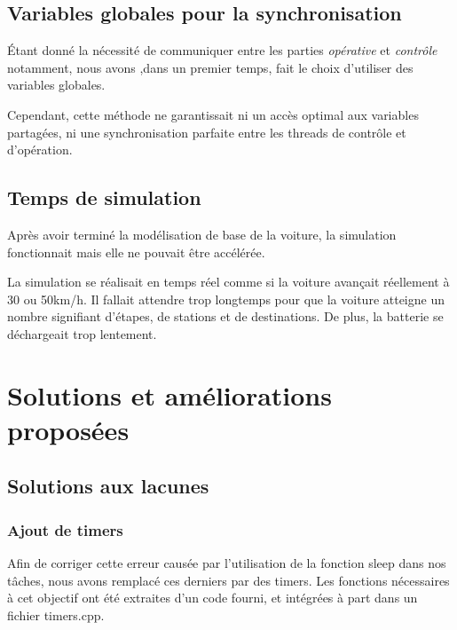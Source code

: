 \documentclass[conference]{IEEEtran}
\begin{document}
\subsection{Variables globales pour la synchronisation}

Étant donné la nécessité de communiquer entre les parties \emph{opérative} et
\emph{contrôle} notamment, nous avons ,dans un premier temps, fait le choix d'utiliser des
variables globales. 

Cependant, cette méthode ne garantissait ni un accès optimal aux variables partagées, ni
une synchronisation parfaite entre les threads de contrôle et d'opération.

\subsection{Temps de simulation}

Après avoir terminé la modélisation de base de la voiture, la simulation fonctionnait mais
elle ne pouvait être accélérée.

La simulation se réalisait en temps réel comme si la voiture avançait réellement à 30 ou
50km/h. Il fallait attendre trop longtemps pour que la voiture atteigne un nombre
signifiant d'étapes, de stations et de destinations. De plus, la batterie se déchargeait
trop lentement.


\section{Solutions et améliorations proposées}
\label{sec:ameliorations}

\subsection{Solutions aux lacunes}

\subsubsection{Ajout de timers}

Afin de corriger cette erreur causée par l'utilisation de la fonction sleep dans nos
tâches, nous avons remplacé ces derniers par des timers. Les fonctions nécessaires à cet
objectif ont été extraites d'un code fourni, et intégrées à part dans un fichier
timers.cpp. 
\end{document}
